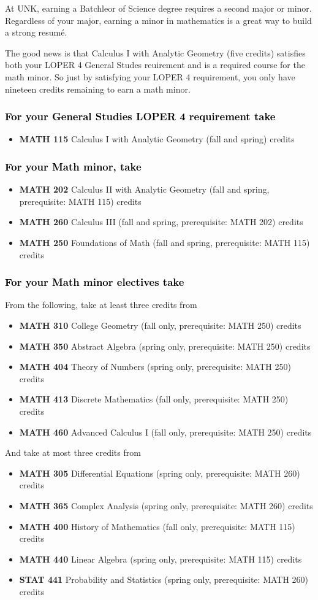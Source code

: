 \documentclass[10pt]{article}
\newcommand{\calcone}{\textbf{MATH 115} Calculus I with Analytic Geometry (fall and spring) \dotfill 5 credits}
\newcommand{\calctwo}{\textbf{MATH 202} Calculus II with Analytic Geometry (fall and spring, prerequisite: MATH 115) \dotfill 5 credits }
\newcommand{\foundations}{\textbf{MATH 250} Foundations of Math (fall and spring, prerequisite: MATH 115)  \dotfill 3 credits}
\newcommand{\calcthree}{\textbf{MATH 260} Calculus III  (fall and spring, prerequisite: MATH 202) \dotfill 5 credits}
\newcommand{\linear}{\textbf{MATH 440} Linear Algebra (spring only, prerequisite: MATH 115) \dotfill 3 credits}
\newcommand{\discrete}{\textbf{MATH 413} Discrete Mathematics  (fall only, prerequisite: MATH 250)\dotfill 3 credits}
\newcommand{\statistics}{\textbf{STAT 441} Probability and Statistics (spring only, prerequisite: MATH 260)  \dotfill  3 credits}
\newcommand{\diffeq}{\textbf{MATH 305}	Differential Equations (spring only, prerequisite: MATH 260) \dotfill 	3 credits}
\newcommand{\abstractalgebra}{\textbf{MATH 350}	Abstract Algebra (spring only, prerequisite: MATH 250) \dotfill 	3 credits}
\newcommand{\complex}{\textbf{MATH 365}	Complex Analysis (spring only,  prerequisite: MATH 260) \dotfill 3 credits}
\newcommand{\collegegeometry}{\textbf{MATH 310}	College Geometry (fall only,  prerequisite: MATH 250) \dotfill 3 credits}
\newcommand{\mathhistory}{\textbf{MATH 400} History of Mathematics (fall only,  prerequisite: MATH 115) \dotfill 3 credits}
\newcommand{\numbertheory}{\textbf{MATH 404} Theory of Numbers (spring only,  prerequisite: MATH 250) \dotfill 3 credits}
\newcommand{\advancedcalc}{\textbf{MATH 460}	Advanced Calculus I  (fall only,   prerequisite: MATH 250) \dotfill 3 credits}
\begin{document}
At UNK, earning a Batchleor of Science degree requires a second major or minor.
Regardless of your major, earning a minor in mathematics is a great way to build
a strong resum\'e.

The good news is that Calculus I with Analytic Geometry (five credits) satisfies both your LOPER 4 General Studes reuirement and is a required course for the math minor. So just by satisfying your LOPER 4 requirement, you only have nineteen credits remaining to earn a math minor.

\subsubsection*{\textcolor{black}{For your General Studies LOPER 4 requirement take}}
\begin{itemize}
\item \calcone
\end{itemize}


\subsubsection*{\textcolor{black}{For your Math minor, take}}
\begin{itemize}
  \item \calctwo
  \item \calcthree
\item \foundations
\end{itemize}

\subsubsection*{\textcolor{black}{For your Math minor electives take}}

From the following, take at least three credits from
\vspace{0.1in}

\begin{itemize}
\item \collegegeometry
\item \abstractalgebra
\item \numbertheory
\item \discrete
\item \advancedcalc
\end{itemize}

\vspace{0.1in}
And take at most  three credits from
\vspace{0.1in}
\begin{itemize}
\item \diffeq
\item \complex
\item \mathhistory
\item \linear
\item \statistics
\end{itemize}
\end{document}
